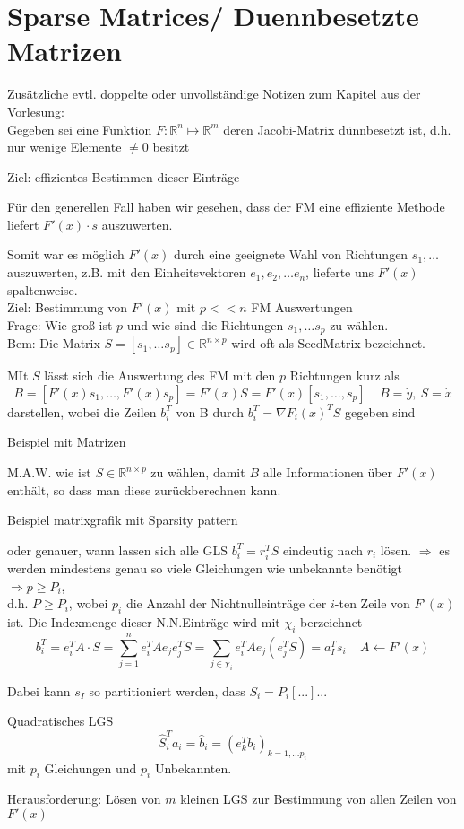 \section{Sparse Matrices/ Duennbesetzte Matrizen}
\label{chap:sparsemats}


\noindent\makebox[\linewidth]{\rule{\paperwidth}{0.4pt}}
Zusätzliche evtl. doppelte oder unvollständige Notizen zum Kapitel aus der Vorlesung:\\

Gegeben sei eine Funktion $F:\mathbb{R}^n\mapsto\mathbb{R}^m$ deren Jacobi-Matrix dünnbesetzt ist, d.h. nur wenige Elemente $\neq 0 $ besitzt


Ziel: effizientes Bestimmen dieser Einträge

Für den generellen Fall haben wir gesehen, dass der FM eine effiziente Methode liefert $F'(x)\cdot s$ auszuwerten.

Somit war es möglich $F'(x)$ durch eine geeignete Wahl von Richtungen  $s_1,\dots$ auszuwerten, z.B. mit den Einheitsvektoren $e_1,e_2, \dots e_n$, lieferte uns $F'(x)$ spaltenweise.\\



\noindent
Ziel: Bestimmung von $F'(x)$ mit $p <<n$ FM Auswertungen\\
Frage: Wie groß ist $p$ und wie sind die Richtungen $s_1,\dots s_p$ zu wählen.\\
Bem: Die Matrix $S = [s_1, \dots s_p] \in \mathbb{R}^{n\times p}$ wird oft als \glqq Seed\grqq Matrix bezeichnet.

MIt $S$ lässt sich die Auswertung des FM mit den $p$ Richtungen kurz als 
$$B = [ F'(x)s_1 , \dots , F'(x)s_p] = F'(x) S = F'(x) [s_1,\dots,s_p]\ \ \ \ \  B= \dot{y},\ S=\dot{x}$$
darstellen, wobei die Zeilen $b_i^T$ von B durch $b_i^T = \nabla F_i(x)^TS$ gegeben sind

Beispiel mit Matrizen

M.A.W. wie ist $S\in\mathbb{R}^{n\times p}$ zu wählen, damit $B$ alle Informationen über $F'(x)$ enthält, so dass man diese zurückberechnen kann.

Beispiel matrixgrafik mit Sparsity pattern

oder genauer, wann lassen sich alle GLS $b_i^T = r_i^TS$ eindeutig nach $r_i$ lösen.
$\Rightarrow$ es werden mindestens genau so viele Gleichungen wie unbekannte benötigt\\
$\Rightarrow p \ge P_i$,\\

d.h. $P \geq P_i$, wobei $p_i$ die Anzahl der Nichtnulleinträge der $i$-ten Zeile von $F'(x)$ ist. Die Indexmenge dieser N.N.Einträge wird mit $\chi_i$ berzeichnet
$$b_i^T = e_i^T A \cdot S = \sum_{j=1}^n e_i^T A e_j e_j^T S =\sum_{j\in \chi_i} e_i^T A e_j (e_j^T S) = a_I^T s_i \ \ \ \ \ A \leftarrow F'(x)$$

Dabei kann $s_I$ so partitioniert werden, dass $S_i = P_i [...]...$

Quadratisches LGS
$$\hat{S}_i^Ta_i = \hat{b}_i = (e_k^Tb_i)_{k=1,\dots p_i}$$
mit $p_i$ Gleichungen und $p_i$ Unbekannten.

Herausforderung: Lösen von $m$ kleinen LGS zur Bestimmung von allen Zeilen von $F'(x)$\\


